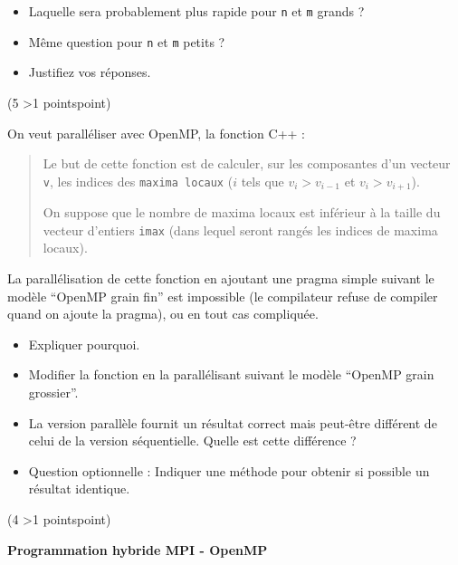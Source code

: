 \documentclass[12pt]{report}
\newcounter{cptPoints}
\newcounter{cptQuestions}
\newcommand\question[2]{\bigskip\par\addtocounter{cptQuestions}{1}\addtocounter{cptPoints}{#2}{\bf Question #1 n\textsuperscript{o} \thecptQuestions} (#2 \ifnum #2>1 points\else point\fi)\par}
\begin{document}
	
	\begin{itemize}
		\item Laquelle sera probablement plus rapide pour {\tt n} et {\tt m} grands ?
		\item M\^eme question pour {\tt n} et {\tt m} petits ?
		\item Justifiez vos réponses.
	\end{itemize}

\vfill\eject

	\question{}5
	\medskip
	
	On veut parall\'eliser avec OpenMP, la fonction C++ :
\begin{center}
	\begin{minipage}{10cm}
	
\end{minipage}
\end{center}
	
	\begin{quotation}\noindent%
		Le but de cette fonction est de calculer, sur les composantes d'un vecteur {\tt v}, les indices des {\tt maxima locaux} ($i$ tels que $v_i > v_{i-1}$ et $v_i > v_{i+1}$).
		
		\noindent%
		On suppose que le nombre de maxima locaux est inf\'erieur \`a la taille du vecteur d'entiers {\tt imax} (dans lequel seront rang\'es les indices de maxima locaux).
	\end{quotation}
	 
 La parall\'elisation de cette fonction en ajoutant une pragma simple suivant le mod\`ele ``OpenMP grain fin'' est impossible (le compilateur refuse de compiler quand on ajoute la pragma), ou en tout cas compliqu\'ee.
 
	 \begin{itemize}
	 	\item Expliquer pourquoi.
	 	\item Modifier la fonction en la parall\'elisant suivant le mod\`ele ``OpenMP grain grossier''.
	 	\item La version parall\`ele fournit un r\'esultat correct mais peut-\^etre diff\'erent de celui de la version s\'equentielle. Quelle est cette diff\'erence ?
	 	\item Question optionnelle : Indiquer une m\'ethode pour obtenir si possible un r\'esultat identique.
	 \end{itemize}
\vfill\eject
	 
\question{}4
         
{\bf Programmation hybride MPI - OpenMP}
\medskip
\end{document}

